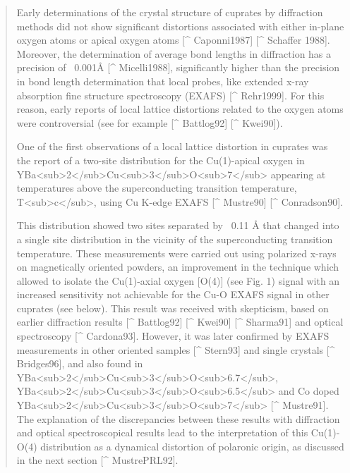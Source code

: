\begin{quote}
Early determinations of the crystal structure of cuprates by diffraction methods did not show significant distortions associated with either in-plane oxygen atoms or apical oxygen atoms [^ Caponni1987] [^ Schaffer 1988]. Moreover, the determination of  average bond lengths in diffraction has a precision of ~0.001Å [^ Micelli1988], significantly higher than the precision in bond length determination that local probes, like extended x-ray absorption fine structure spectroscopy (EXAFS) [^ Rehr1999]. For this reason, early reports of local lattice distortions related to the oxygen atoms  were controversial (see for example [^ Battlog92] [^ Kwei90]).

One of the first observations of a local lattice distortion in cuprates was the report of a two-site distribution for the Cu(1)-apical oxygen in YBa<sub>2</sub>Cu<sub>3</sub>O<sub>7</sub>  appearing at temperatures above the superconducting transition temperature, T<sub>c</sub>, using Cu K-edge EXAFS [^ Mustre90] [^ Conradson90]. 

This distribution showed two sites separated by ~0.11 Å that changed into a single site distribution in the vicinity of the superconducting transition temperature.  These measurements were carried out using polarized x-rays on magnetically oriented powders, an improvement in the technique which allowed to isolate the Cu(1)-axial oxygen [O(4)] (see Fig. 1) signal with an increased sensitivity not achievable for the Cu-O EXAFS signal in other cuprates (see below). This result was received with skepticism, based on earlier diffraction results [^ Battlog92] [^ Kwei90] [^ Sharma91] and optical spectroscopy [^ Cardona93]. However, it was later confirmed by EXAFS measurements in other oriented samples [^ Stern93] and single crystals [^ Bridges96], and also found in YBa<sub>2</sub>Cu<sub>3</sub>O<sub>6.7</sub>, YBa<sub>2</sub>Cu<sub>3</sub>O<sub>6.5</sub> and Co doped YBa<sub>2</sub>Cu<sub>3</sub>O<sub>7</sub> [^ Mustre91]. The explanation of the discrepancies between these results with diffraction and optical spectroscopical results lead to the interpretation of  this Cu(1)-O(4) distribution as a dynamical distortion of polaronic origin, as discussed in the next section [^ MustrePRL92].


\end{quote}
